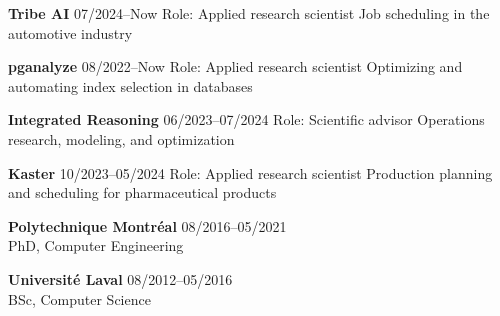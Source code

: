 \documentclass{memoir}
\begin{document}
\par
\vspace{1.5\baselineskip}
\begin{list}{}{
    \setlength\leftmargin{1.2in}
    \setlength\rightmargin{0in}
    \setlength{}
    \setlength{}
    \setlength\listparindent{0in}
    \setlength\itemindent{0in}
    \setlength\parskip{0in}
    \setlength\topsep{0in}
    \setlength\parsep{0in}
    \setlength\itemsep{0.90\baselineskip}
    \setlength\partopsep{0in}}

  


  \Item \textbf{Tribe AI} \hfill 07/2024--Now
  \BulletItem Role: Applied research scientist
  \BulletItem Job scheduling in the automotive industry

  \Item \textbf{pganalyze} \hfill 08/2022--Now
  \BulletItem Role: Applied research scientist
  \BulletItem Optimizing and automating index selection in databases
  
  \Item \textbf{Integrated Reasoning} \hfill 06/2023--07/2024
  \BulletItem Role: Scientific advisor
  \BulletItem Operations research, modeling, and optimization

  \Item \textbf{Kaster} \hfill 10/2023--05/2024
  \BulletItem Role: Applied research scientist
  \BulletItem Production planning and scheduling for pharmaceutical products




  

  \Item \textbf{Polytechnique Montréal} \hfill 08/2016--05/2021 \\
  PhD, Computer Engineering

  \Item \textbf{Université Laval} \hfill 08/2012--05/2016 \\
  BSc, Computer Science

  


\end{list}
\end{document}
